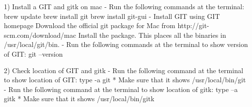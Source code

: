 1)	Install a GIT and gitk on mac
-	Run the following commands at the terminal:
brew update
brew install git
brew install git-gui
- Install GIT using GIT homepage
Download the official git package for Mac from http://git-scm.com/download/mac
Install the package. This places all the binaries in /usr/local/git/bin.
-	Run the following commands at the terminal to show version of GIT:
git --version

2) Check location of GIT and gitk
- Run the following command at the terminal to show location of GIT:
type -a git
* Make sure that it shows /usr/local/bin/git
- Run the following command at the terminal to show location of gitk:
type –a gitk
* Make sure that it shows /usr/local/bin/gitk
